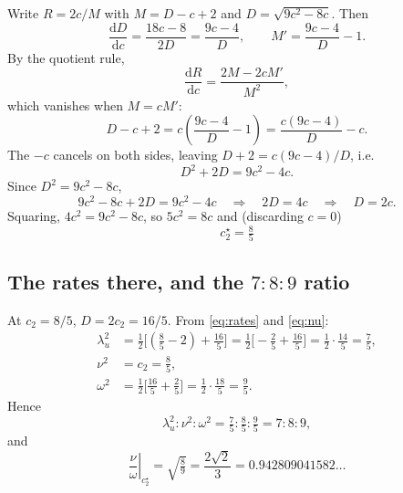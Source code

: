 \documentclass[11pt,a4paper]{article}
\begin{document}
Write $R=2c/M$ with $M=D-c+2$ and $D=\sqrt{9c^2-8c}$. Then
\begin{equation}
  \frac{\mathrm{d}D}{\mathrm{d}c}=\frac{18c-8}{2D}=\frac{9c-4}{D},
  \qquad
  M' = \frac{9c-4}{D}-1 .
\end{equation}
By the quotient rule,
\begin{equation}
  \frac{\mathrm{d}R}{\mathrm{d}c} = \frac{2M-2cM'}{M^2},
\end{equation}
which vanishes when $M=cM'$:
\begin{equation}
  D-c+2 = c\left(\frac{9c-4}{D}-1\right) = \frac{c(9c-4)}{D}-c .
\end{equation}
The $-c$ cancels on both sides, leaving $D+2=c(9c-4)/D$, i.e.
\begin{equation}
  D^2+2D = 9c^2-4c .
\end{equation}
Since $D^2=9c^2-8c$,
\begin{equation}
  9c^2-8c+2D = 9c^2-4c
  \quad\Longrightarrow\quad
  2D = 4c
  \quad\Longrightarrow\quad
  D = 2c .
\end{equation}
Squaring, $4c^2=9c^2-8c$, so $5c^2=8c$ and (discarding $c=0$)
\begin{equation}
  \boxed{\;c_2^\star = \tfrac85\;}
  \label{eq:cstar}
\end{equation}

\subsection{The rates there, and the \texorpdfstring{$7:8:9$}{7:8:9} ratio}

At $c_2=8/5$, $D=2c_2=16/5$. From \eqref{eq:rates} and \eqref{eq:nu}:
\begin{align}
  \lambda_u^2 &= \tfrac12\bigl[(\tfrac85-2)+\tfrac{16}5\bigr]
               = \tfrac12\bigl[-\tfrac25+\tfrac{16}5\bigr]
               = \tfrac12\cdot\tfrac{14}5 = \tfrac75, \\
  \nu^2       &= c_2 = \tfrac85, \\
  \omega^2    &= \tfrac12\bigl[\tfrac{16}5+\tfrac25\bigr]
               = \tfrac12\cdot\tfrac{18}5 = \tfrac95 .
\end{align}
Hence
\begin{equation}
  \lambda_u^2:\nu^2:\omega^2 = \tfrac75:\tfrac85:\tfrac95 = 7:8:9,
\end{equation}
and
\begin{equation}
  \left.\frac{\nu}{\omega}\right|_{c_2^\star}
  = \sqrt{\tfrac89} = \frac{2\sqrt2}{3} = 0.942809041582\ldots
  \label{eq:bound}
\end{equation}
\end{document}
